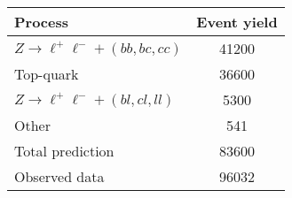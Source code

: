 
\begin{tabular}{lS[table-format=5.0(4)]}
  \toprule
  Process & {Event yield} \\
  \midrule
  $Z \to \ell^+\ell^- + (bb,bc,cc)$ & 41200  \\
  Top-quark & 36600  \\
  $Z \to \ell^+\ell^- + (bl,cl,ll)$ & 5300  \\
  Other & 541  \\
  \midrule
  Total prediction & 83600  \\
  \midrule
  Observed data & 96032 \\
  \bottomrule
\end{tabular}


